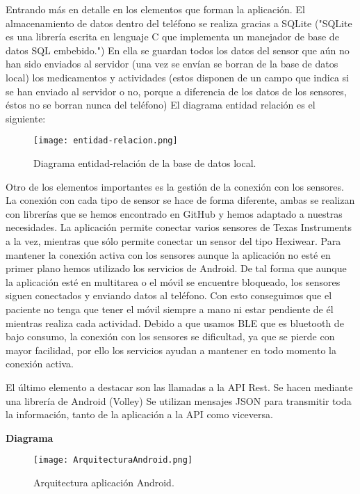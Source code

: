 \documentclass[11pt,spanish]{article}
\begin{document}
Entrando más en detalle en los elementos que forman la aplicación. El almacenamiento de datos dentro del teléfono se realiza gracias a SQLite ("SQLite es una librería escrita en lenguaje C que implementa un manejador de base de datos SQL embebido.") En ella se guardan todos los datos del sensor que aún no han sido enviados al servidor (una vez se envían se borran de la base de datos local) los medicamentos y actividades (estos disponen de un campo que indica si se han enviado al servidor o no, porque a diferencia de los datos de los sensores, éstos no se borran nunca del teléfono) El diagrama entidad relación es el siguiente:
\newline

\begin{figure}[h!]
\centering
\texttt{[image: entidad-relacion.png]}
\caption{Diagrama entidad-relación de la base de datos local.}
\end{figure}

Otro de los elementos importantes es la gestión de la conexión con los sensores. La conexión con cada tipo de sensor se hace de forma diferente, ambas se realizan con librerías que se hemos encontrado en GitHub y hemos adaptado a nuestras necesidades. La aplicación permite conectar varios sensores de Texas Instruments a la vez, mientras que sólo permite conectar un sensor del tipo Hexiwear. Para mantener la conexión activa con los sensores aunque la aplicación no esté en primer plano hemos utilizado los servicios de Android. De tal forma que aunque la aplicación esté en multitarea o el móvil se encuentre bloqueado, los sensores siguen conectados y enviando datos al teléfono. Con esto conseguimos que el paciente no tenga que tener el móvil siempre a mano ni estar pendiente de él mientras realiza cada actividad. Debido a que usamos BLE que es bluetooth de bajo consumo, la conexión con los sensores se dificultad, ya que se pierde con mayor facilidad, por ello los servicios ayudan a mantener en todo momento la conexión activa.
\newline

El último elemento a destacar son las llamadas a la API Rest. Se hacen mediante una librería de Android (Volley) Se utilizan mensajes JSON para transmitir toda la información, tanto de la aplicación a la API como viceversa.
\newline

{\bf Diagrama}
\begin{figure}[h!]
  \centering
  \texttt{[image: ArquitecturaAndroid.png]}
  \caption{Arquitectura aplicación Android.}
\end{figure}
\newpage
\end{document}
